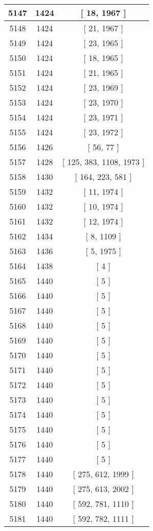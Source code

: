 \begin{center}
\begin{longtable}[H]{|| c c c ||}
\hline
5147 & 1424 & [ 18, 1967 ] \\ 
\hline
5148 & 1424 & [ 21, 1967 ] \\ 
\hline
5149 & 1424 & [ 23, 1965 ] \\ 
\hline
5150 & 1424 & [ 18, 1965 ] \\ 
\hline
5151 & 1424 & [ 21, 1965 ] \\ 
\hline
5152 & 1424 & [ 23, 1969 ] \\ 
\hline
5153 & 1424 & [ 23, 1970 ] \\ 
\hline
5154 & 1424 & [ 23, 1971 ] \\ 
\hline
5155 & 1424 & [ 23, 1972 ] \\ 
\hline
5156 & 1426 & [ 56, 77 ] \\ 
\hline
5157 & 1428 & [ 125, 383, 1108, 1973 ] \\ 
\hline
5158 & 1430 & [ 164, 223, 581 ] \\ 
\hline
5159 & 1432 & [ 11, 1974 ] \\ 
\hline
5160 & 1432 & [ 10, 1974 ] \\ 
\hline
5161 & 1432 & [ 12, 1974 ] \\ 
\hline
5162 & 1434 & [ 8, 1109 ] \\ 
\hline
5163 & 1436 & [ 5, 1975 ] \\ 
\hline
5164 & 1438 & [ 4 ] \\ 
\hline
5165 & 1440 & [ 5 ] \\ 
\hline
5166 & 1440 & [ 5 ] \\ 
\hline
5167 & 1440 & [ 5 ] \\ 
\hline
5168 & 1440 & [ 5 ] \\ 
\hline
5169 & 1440 & [ 5 ] \\ 
\hline
5170 & 1440 & [ 5 ] \\ 
\hline
5171 & 1440 & [ 5 ] \\ 
\hline
5172 & 1440 & [ 5 ] \\ 
\hline
5173 & 1440 & [ 5 ] \\ 
\hline
5174 & 1440 & [ 5 ] \\ 
\hline
5175 & 1440 & [ 5 ] \\ 
\hline
5176 & 1440 & [ 5 ] \\ 
\hline
5177 & 1440 & [ 5 ] \\ 
\hline
5178 & 1440 & [ 275, 612, 1999 ] \\ 
\hline
5179 & 1440 & [ 275, 613, 2002 ] \\ 
\hline
5180 & 1440 & [ 592, 781, 1110 ] \\ 
\hline
5181 & 1440 & [ 592, 782, 1111 ] \\ 

\end{longtable}
\end{center}
